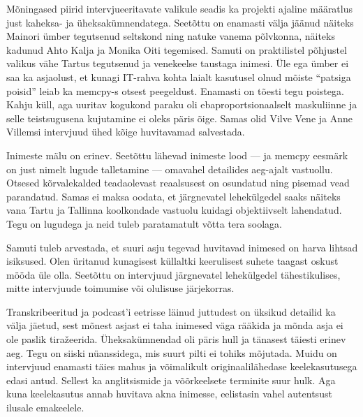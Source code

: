 Mõningased piirid intervjueeritavate valikule seadis ka projekti ajaline määratlus just 
kaheksa- ja üheksakümnendatega. Seetõttu on enamasti välja jäänud näiteks 
Mainori ümber tegutsenud seltskond ning natuke vanema põlvkonna, 
näiteks kadunud Ahto Kalja ja Monika 
Oiti tegemised. Samuti on praktilistel põhjustel 
valikus vähe Tartus tegutsenud ja venekeelse taustaga inimesi. Üle ega 
ümber ei saa ka asjaolust, et kunagi IT-rahva kohta laialt kasutusel olnud 
mõiste \enquote{patsiga poisid} leiab ka memcpy-s otsest peegeldust. Enamasti 
on tõesti tegu poistega. Kahju küll, aga uuritav kogukond paraku oli 
ebaproportsionaalselt maskuliinne ja selle teistsugusena kujutamine ei oleks 
päris õige. Samas olid Vilve Vene ja Anne 
Villemsi intervjuud ühed kõige huvitavamad salvestada.

Inimeste mälu on erinev. Seetõttu lähevad inimeste lood --- ja memcpy eesmärk on just nimelt lugude 
talletamine --- omavahel detailides aeg-ajalt vastuollu. Otsesed 
kõrvalekalded teadaolevast reaalsusest on osundatud ning pisemad vead 
parandatud. Samas ei maksa oodata, et järgnevatel lehekülgedel saaks näiteks vana 
Tartu ja Tallinna koolkondade vastuolu kuidagi objektiivselt lahendatud. 
Tegu on lugudega ja neid tuleb paratamatult võtta tera soolaga.

Samuti tuleb arvestada, et suuri asju tegevad huvitavad inimesed on harva 
lihtsad isiksused. Olen üritanud kunagisest küllaltki keerulisest suhete taagast 
oskust mööda üle olla. Seetõttu on intervjuud järgnevatel lehekülgedel 
tähestikulises, mitte intervjuude toimumise või olulisuse järjekorras. 

Transkribeeritud ja podcast'i eetrisse läinud juttudest on üksikud 
detailid ka välja jäetud, sest mõnest asjast ei taha inimesed väga rääkida ja 
mõnda asja ei ole paslik tiražeerida. Üheksakümnendad oli päris hull ja 
tänasest täiesti erinev aeg. Tegu on siiski nüanssidega, mis suurt pilti ei 
tohiks mõjutada. Muidu on intervjuud enamasti täies mahus ja võimalikult originaalilähedase keelekasutusega edasi antud. 
Sellest ka anglitsismide ja võõrkeelsete terminite suur hulk. 
Aga kuna keelekasutus annab huvitava akna inimesse, eelistasin vahel autentsust 
ilusale emakeelele.

